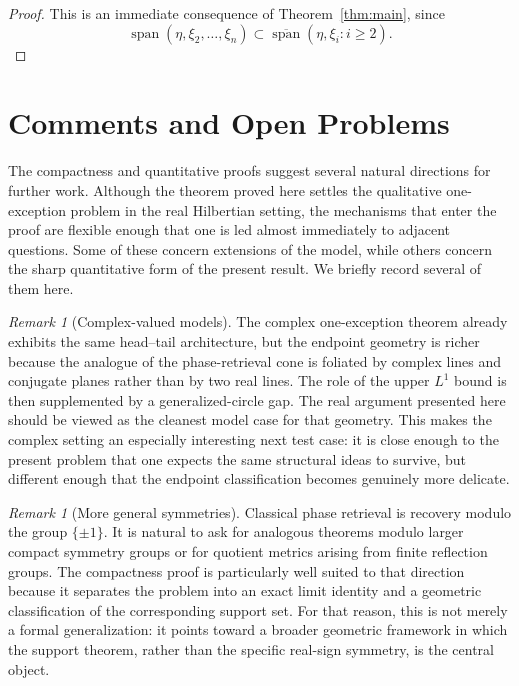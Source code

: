 \documentclass[11pt]{amsart}
\numberwithin{equation}{section}
\theoremstyle{definition}
\theoremstyle{remark}
\newtheorem{remark}[theorem]{Remark}
\newcommand{\Span}{\operatorname{span}}
\begin{document}
\begin{proof}
This is an immediate consequence of Theorem~\ref{thm:main}, since
\[
\Span(\eta,\xi_2,\dots,\xi_n)\subset \overline{\Span}(\eta,\xi_i:i\ge2).
\]
\end{proof}

\section{Comments and Open Problems}\label{sec:comments}

The compactness and quantitative proofs suggest several natural directions for
further work.  Although the theorem proved here settles the qualitative
one-exception problem in the real Hilbertian setting, the mechanisms that enter
the proof are flexible enough that one is led almost immediately to adjacent
questions.  Some of these concern extensions of the model, while others concern
the sharp quantitative form of the present result.  We briefly record several
of them here.

\begin{remark}[Complex-valued models]
The complex one-exception theorem already exhibits the same head--tail
architecture, but the endpoint geometry is richer because the analogue of the
phase-retrieval cone is foliated by complex lines and conjugate planes rather
than by two real lines.  The role of the upper $L^1$ bound is then supplemented
by a generalized-circle gap.  The real argument presented here should be viewed
as the cleanest model case for that geometry.  This makes the complex setting
an especially interesting next test case: it is close enough to the present
problem that one expects the same structural ideas to survive, but different
enough that the endpoint classification becomes genuinely more delicate.
\end{remark}

\begin{remark}[More general symmetries]
Classical phase retrieval is recovery modulo the group $\{\pm1\}$.  It is
natural to ask for analogous theorems modulo larger compact symmetry groups or
for quotient metrics arising from finite reflection groups.  The compactness
proof is particularly well suited to that direction because it separates the
problem into an exact limit identity and a geometric classification of the
corresponding support set.  For that reason, this is not merely a formal
generalization: it points toward a broader geometric framework in which the
support theorem, rather than the specific real-sign symmetry, is the central
object.
\end{remark}
\end{document}
